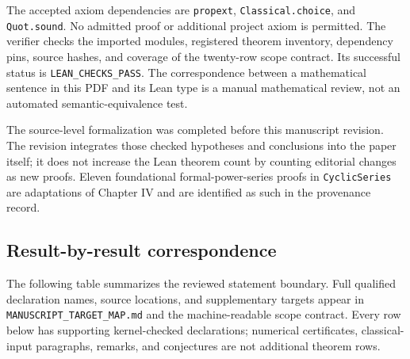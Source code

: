 \documentclass[11pt,letterpaper]{article}
\theoremstyle{plain}
\theoremstyle{plain}
\theoremstyle{plain}
\theoremstyle{definition}
\theoremstyle{definition}
\theoremstyle{definition}
\theoremstyle{definition}
\theoremstyle{remark}
\theoremstyle{remark}
\theoremstyle{remark}
\theoremstyle{remark}
\begin{document}
The accepted axiom dependencies are \texttt{propext}, \texttt{Classical.choice}, and \texttt{Quot.sound}. No admitted proof or additional project axiom is permitted. The verifier checks the imported modules, registered theorem inventory, dependency pins, source hashes, and coverage of the twenty-row scope contract. Its successful status is \texttt{LEAN\_CHECKS\_PASS}. The correspondence between a mathematical sentence in this PDF and its Lean type is a manual mathematical review, not an automated semantic-equivalence test.

The source-level formalization was completed before this manuscript revision. The revision integrates those checked hypotheses and conclusions into the paper itself; it does not increase the Lean theorem count by counting editorial changes as new proofs. Eleven foundational formal-power-series proofs in \texttt{CyclicSeries} are adaptations of Chapter IV and are identified as such in the provenance record.

\subsection{Result-by-result correspondence}

The following table summarizes the reviewed statement boundary. Full qualified declaration names, source locations, and supplementary targets appear in \texttt{MANUSCRIPT\_TARGET\_MAP.md} and the machine-readable scope contract. Every row below has supporting kernel-checked declarations; numerical certificates, classical-input paragraphs, remarks, and conjectures are not additional theorem rows.
\end{document}
